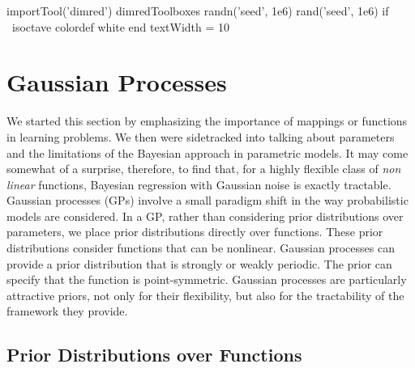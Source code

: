 \begin{matlab}
  importTool('dimred')
  dimredToolboxes
  randn('seed', 1e6)
  rand('seed', 1e6)
  if ~isoctave
    colordef white
  end
  textWidth = 10
\end{matlab}

\chapter{Gaussian Processes}\label{chap:gp}


We started this section by emphasizing the importance of mappings or
functions in learning problems. We then were sidetracked into talking
about parameters and the limitations of the Bayesian approach in
parametric models. It may come somewhat of a surprise, therefore, to
find that, for a highly flexible class of \emph{non linear} functions,
Bayesian regression with Gaussian noise is exactly tractable. Gaussian
processes (GPs) involve a small paradigm shift in the way
probabilistic models are considered. In a GP, rather than considering
prior distributions over parameters, we place prior distributions
directly over functions. These prior distributions consider functions
that can be nonlinear. Gaussian processes can provide a prior
distribution that is strongly or weakly periodic. The prior can
specify that the function is point-symmetric. Gaussian processes are
particularly attractive priors, not only for their flexibility, but
also for the tractability of the framework they provide.


\section{Prior Distributions over Functions}

